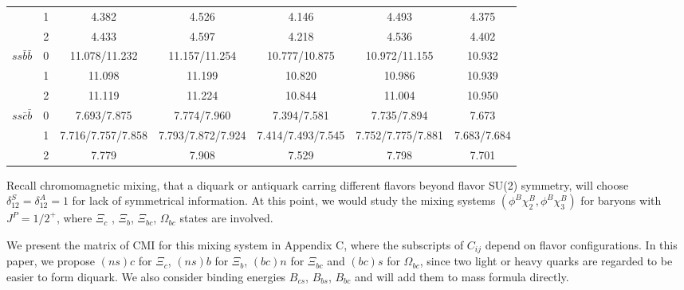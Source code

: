 \documentclass[prd,twocolumn,floatfix,nofootinbib]{revtex4}
\begin{document}
\begin{table}[!htbp]
\begin{tabular}{ccccccc}
                        &1      &4.382                  &4.526                               &4.146                               &4.493                  &4.375 \\ 
                        &2      &4.433                  &4.597                               &4.218                               &4.536                  &4.402 \\ 
        $ss\bar{b}\bar{b}$ 
                        &0      &11.078/11.232          &11.157/11.254                       &10.777/10.875                       &10.972/11.155          &10.932 \\ 
                        &1      &11.098                 &11.199                              &10.820                              &10.986                 &10.939 \\ 
                        &2      &11.119                 &11.224                              &10.844                              &11.004                 &10.950 \\ 
        $ss\bar{c}\bar{b}$ 
                        &0      &7.693/7.875            &7.774/7.960                         &7.394/7.581                         &7.735/7.894            &7.673 \\ 
                        &1      &7.716/7.757/7.858      &7.793/7.872/7.924                   &7.414/7.493/7.545                   &7.752/7.775/7.881      &7.683/7.684 \\ 
                        &2      &7.779                  &7.908                               &7.529                               &7.798                  &7.701 \\ 
        \hline\hline
    \end{tabular}
\end{table}

Recall chromomagnetic mixing, that a diquark or antiquark carring different flavors beyond flavor SU(2) symmetry, will choose $\delta_{12}^{S}=\delta_{12}^{A}=1$ for lack of symmetrical information.
At this point, we would study the mixing systems $(\phi^{B}\chi_{2}^{B},\phi^{B}\chi_{3}^{B})$ for baryons with $J^{P}={1/2}^{+}$, 
where $\Xi_{c}$ , $\Xi_{b}$, $\Xi_{bc}$, $\Omega_{bc}$ states are involved.

We present the matrix of CMI for this mixing system in Appendix C, where the subscripts of $C_{ij}$ depend on flavor configurations. 
In this paper, we propose $(ns)c$ for $\Xi_{c}$, $(ns)b$ for $\Xi_{b}$, $(bc)n$ for $\Xi_{bc}$ and $(bc)s$ for $\Omega_{bc}$, since two light or heavy quarks are regarded to be easier to form diquark.
We also consider binding energies $B_{cs}$, $B_{bs}$, $B_{bc}$ and will add them to mass formula directly.
\end{document}
